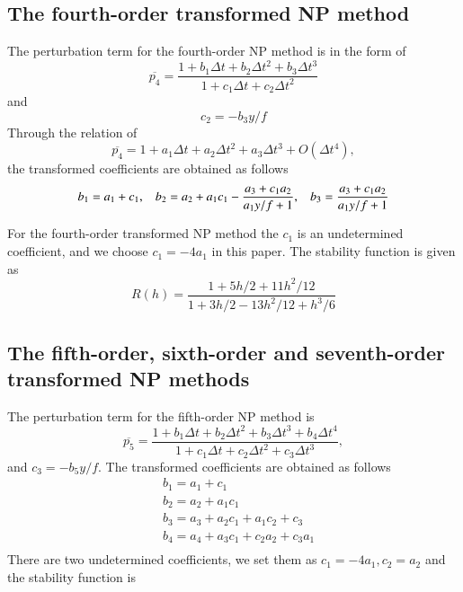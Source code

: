 \documentclass[review]{elsarticle}
\theoremstyle{plain}\newtheorem{definition}{\sc{Definition}}
\theoremstyle{defination}\newtheorem{example}{Example}[section]
\numberwithin{equation}{section}
\numberwithin{table}{section}
\begin{document}
{\subsection{The fourth-order transformed NP method}
The perturbation term for  the fourth-order NP method is in the  form of
\begin{equation}
  \overline{p_4} = \frac{1+b_1 \Delta t + b_2 \Delta t^2 +b_3\Delta t^3}{1+c_1 \Delta t +c_2 \Delta t^2}
  \end{equation}
  and 
  \begin{equation}
	c_2= -b_3y/f
	\end{equation}
Through the relation of 
\begin{equation}
  \overline{p_4}= 1+a_1 \Delta t + a_2\Delta t^2 +a_3\Delta t^3 +O(\Delta t^4),
  \end{equation}
the transformed coefficients are obtained  as follows
\begin{equation}
  b_1= a_1+ c_1, \hspace{0.3cm} b_2= a_2+a_1c_1 -\frac{a_3+c_1a_2}{a_1y/f+1}, \hspace{0.3cm} b_3=  \frac{a_3+c_1 a_2}{a_1y/f+1}
  \end{equation}

 For   the fourth-order transformed NP method the $c_1$ is an undetermined coefficient, and we choose  $c_1 = -4a_1 $ in this paper. The stability function is given as 
  \begin{equation}
	R(h)=\frac{1+5h/2+11h^2/12}{1+3h/2-13h^2/12+h^3/6}
	\end{equation}
	\subsection{The fifth-order, sixth-order and seventh-order  transformed NP methods}
The perturbation term for the fifth-order NP method is
\begin{equation}
  \overline{p_5} = \frac{1+b_1 \Delta t + b_2 \Delta t^2 +b_3\Delta t^3 +b_4\Delta t^4 }{1+c_1 \Delta t+c_2 \Delta t^2 +c_3 \Delta t^3},
  \end{equation}
  and $c_3=-b_5 y/f$.
The transformed coefficients are obtained as follows
\begin{equation}
  \begin{aligned}
  &b_1=a_1+c_1\\
  &b_2=a_2+a_1c_1\\
  &b_3=a_3+a_2c_1+a_1c_2+c_3\\
  &b_4=a_4+a_3c_1+c_2a_2+c_3a_1\\
  \end{aligned}
 \end{equation}
 There are two undetermined coefficients, we set them as $c_1= -4a_1, c_2=a_2$ and the stability function is
 \begin{equation}














\end{equation}}
\end{document}
